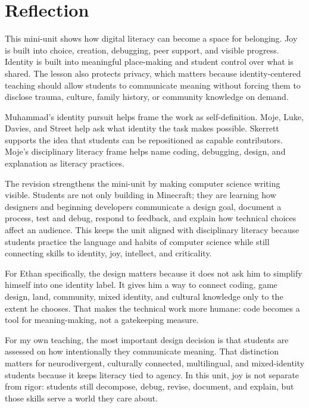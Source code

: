 \newpage
\section*{Reflection}

This mini-unit shows how digital literacy can become a space for belonging. Joy is built into choice, creation, debugging, peer support, and visible progress. Identity is built into meaningful place-making and student control over what is shared. The lesson also protects privacy, which matters because identity-centered teaching should allow students to communicate meaning without forcing them to disclose trauma, culture, family history, or community knowledge on demand.

Muhammad's identity pursuit helps frame the work as self-definition. Moje, Luke, Davies, and Street help ask what identity the task makes possible. Skerrett supports the idea that students can be repositioned as capable contributors. Moje's disciplinary literacy frame helps name coding, debugging, design, and explanation as literacy practices.

\textcolor{LessonTwoAccent}{The revision strengthens the mini-unit by making computer science writing visible. Students are not only building in Minecraft; they are learning how designers and beginning developers communicate a design goal, document a process, test and debug, respond to feedback, and explain how technical choices affect an audience. This keeps the unit aligned with disciplinary literacy because students practice the language and habits of computer science while still connecting skills to identity, joy, intellect, and criticality.}

\textcolor{LessonTwoAccent}{For Ethan specifically, the design matters because it does not ask him to simplify himself into one identity label. It gives him a way to connect coding, game design, land, community, mixed identity, and cultural knowledge only to the extent he chooses. That makes the technical work more humane: code becomes a tool for meaning-making, not a gatekeeping measure.}

For my own teaching, the most important design decision is that students are assessed on how intentionally they communicate meaning. That distinction matters for neurodivergent, culturally connected, multilingual, and mixed-identity students because it keeps literacy tied to agency. In this unit, joy is not separate from rigor: students still decompose, debug, revise, document, and explain, but those skills serve a world they care about.

\newpage
